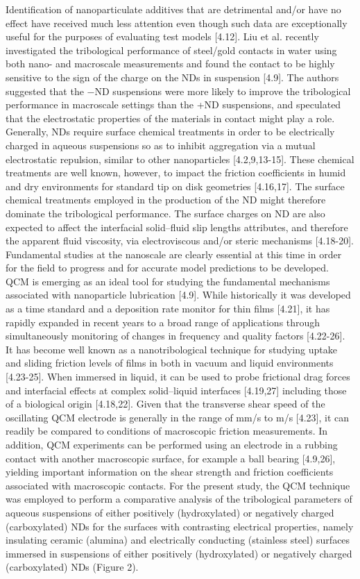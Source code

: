 Identification of nanoparticulate additives that are detrimental and/or have no effect have received much less attention even though such data are exceptionally useful for the purposes of evaluating test models [4.12]. Liu et al. recently investigated the tribological performance of steel/gold contacts in water using both nano- and macroscale measurements and found the contact to be highly sensitive to the sign of the charge on the NDs in suspension [4.9]. The authors suggested that the −ND suspensions were more likely to improve the tribological performance in macroscale settings than the +ND suspensions, and speculated that the electrostatic properties of the materials in contact might play a role. Generally, NDs require surface chemical treatments in order to be electrically charged in aqueous suspensions so as to inhibit aggregation via a mutual electrostatic repulsion, similar to other nanoparticles [4.2,9,13-15]. These chemical treatments are well known, however, to impact the friction coefficients in humid and dry environments for standard tip on disk geometries [4.16,17]. The surface chemical treatments employed in the production of the ND might therefore dominate the tribological performance. The surface charges on ND are also expected to affect the interfacial solid–fluid slip lengths attributes, and therefore the apparent fluid viscosity, via electroviscous and/or steric mechanisms [4.18-20]. Fundamental studies at the nanoscale are clearly essential at this time in order for the field to progress and for accurate model predictions to be developed.
QCM is emerging as an ideal tool for studying the fundamental mechanisms associated with nanoparticle lubrication [4.9]. While historically it was developed as a time standard and a deposition rate monitor for thin films [4.21], it has rapidly expanded in recent years to a broad range of applications through simultaneously monitoring of changes in frequency and quality factors [4.22-26]. It has become well known as a nanotribological technique for studying uptake and sliding friction levels of films in both in vacuum and liquid environments [4.23-25]. When immersed in liquid, it can be used to probe frictional drag forces and interfacial effects at complex solid–liquid interfaces [4.19,27] including those of a biological origin [4.18,22]. Given that the transverse shear speed of the oscillating QCM electrode is generally in the range of mm/s to m/s [4.23], it can readily be compared to conditions of macroscopic friction measurements. In addition, QCM experiments can be performed using an electrode in a rubbing contact with another macroscopic surface, for example a ball bearing [4.9,26], yielding important information on the shear strength and friction coefficients associated with macroscopic contacts.
For the present study, the QCM technique was employed to perform a comparative analysis of the tribological parameters of aqueous suspensions of either positively (hydroxylated) or negatively charged (carboxylated) NDs for the surfaces with contrasting electrical properties, namely insulating ceramic (alumina) and electrically conducting (stainless steel) surfaces immersed in suspensions of either positively (hydroxylated) or negatively charged (carboxylated) NDs (Figure 2).

